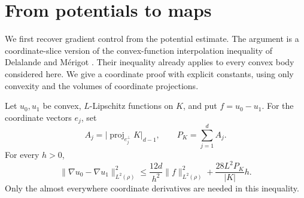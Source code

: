 \section{From potentials to maps}\label{sec:gradient}

We first recover gradient control from the potential estimate.  The argument
is a coordinate-slice version of the convex-function interpolation inequality
of Delalande and M\'erigot \cite[Proposition~4.1]{DelalandeMerigot2023}.
Their inequality already applies to every convex body considered here.
We give a coordinate proof with explicit constants, using only convexity
and the volumes of coordinate projections.

\begin{lemma}\label{gradient:interpolation}
Let $u_0,u_1$ be convex, $L$-Lipschitz functions on $K$, and put
$f=u_0-u_1$.  For the coordinate vectors $e_j$, set
\[
 A_j=\bigl|\operatorname{proj}_{e_j^\perp}K\bigr|_{d-1},
 \qquad P_K=\sum_{j=1}^d A_j.
\]
For every $h>0$,
\begin{equation}\label{gradient:slice-bound}
 \|\nabla u_0-\nabla u_1\|_{L^2(\rho)}^2
 \le \frac{12d}{h^2}\|f\|_{L^2(\rho)}^2
       +\frac{28L^2P_K}{|K|}h.
\end{equation}
Only the almost everywhere coordinate derivatives are needed in this
inequality.
\end{lemma}

